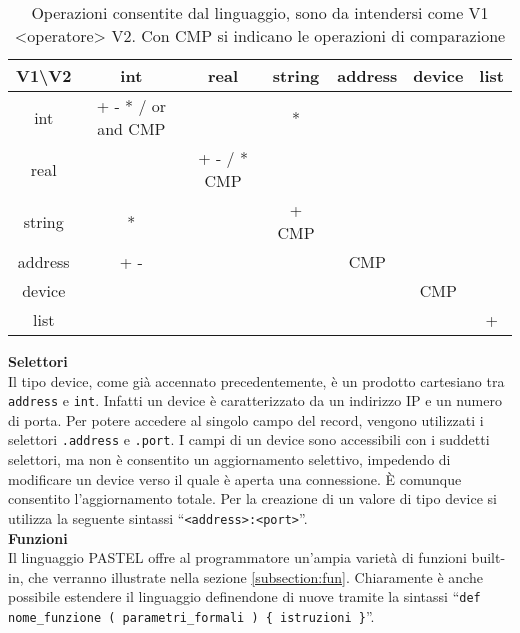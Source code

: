 \documentclass[10pt]{article}
\begin{document}
\begin{table}
	\centering
	\begin{tabular}{|c|c|c|c|c|c|c|}
		\hline
		V1\textbackslash V2 &        int         &    real     &  string  & address & device & list \\ \hline
		        int         & + - * / or and CMP &             &    *     &         &        &      \\ \hline
		       real         &                    & + - / * CMP &          &         &        &      \\ \hline
		      string        &         *          &             & +    CMP &         &        &      \\ \hline
		      address       &        + -         &             &          &   CMP   &        &      \\ \hline
		      device        &                    &             &          &         &  CMP   &      \\ \hline
		       list         &                    &             &          &         &        &  +   \\ \hline
	\end{tabular}
	\caption{Operazioni consentite dal linguaggio, sono da intendersi come V1 <operatore> V2. Con CMP si indicano le operazioni di comparazione}
	\label{table:operatori}
\end{table}


\textbf{Selettori}\\
Il tipo device, come già accennato precedentemente, è un prodotto cartesiano tra \texttt{address} e \texttt{int}. Infatti un device è caratterizzato da un indirizzo IP e un numero di porta. Per potere accedere al singolo campo del record, vengono utilizzati i selettori \texttt{.address} e \texttt{.port}. I campi di un device sono accessibili con i suddetti selettori, ma non è consentito un aggiornamento selettivo, impedendo di modificare un device verso il quale è aperta una connessione. È comunque consentito l'aggiornamento totale. Per la creazione di un valore di tipo device si utilizza la seguente sintassi ``\texttt{<address>:<port>}''.\\

\textbf{Funzioni}\\
Il linguaggio PASTEL offre al programmatore un'ampia varietà di funzioni built-in, che verranno illustrate nella sezione \ref{subsection:fun}. Chiaramente è anche possibile estendere il linguaggio definendone di nuove tramite la sintassi ``\texttt{def nome\_funzione ( parametri\_formali ) \{ istruzioni \}}''.
\\
\end{document}

